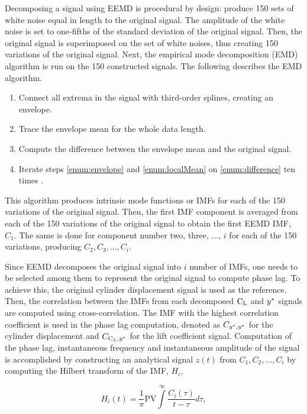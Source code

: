 \documentclass[oneside]{utmthesis}
\begin{document}
Decomposing a signal using EEMD is procedural by design: produce 150 sets of white noise equal in length to the original signal. The amplitude of the white noise is set to one-fifths of the standard deviation of the original signal. Then, the original signal is superimposed on the set of white noises, thus creating 150 variations of the original signal. Next, the empirical mode decomposition (EMD) algorithm is run on the 150 constructed signals. The following describes the EMD algorithm.

\begin{enumerate} \label{enumerate:emd}
  \item Connect all extrema in the signal with third-order splines, creating an envelope. \label{enum:envelope}
  \item Trace the envelope mean for the whole data length. \label{enum:localMean}
  \item Compute the difference between the envelope mean and the original signal. \label{enum:difference}
  \item Iterate steps \ref{enum:envelope} and \ref{enum:localMean} on \ref{enum:difference} ten times \citep{Wu2008}.
\end{enumerate}

This algorithm produces intrinsic mode functions or IMFs for each of the 150 variations of the original signal. Then, the first IMF component is averaged from each of the 150 variations of the original signal to obtain the first EEMD IMF, $C_{1}$. The same is done for component number two, three, ..., $i$ for each of the 150 variations, producing $C_{2},C_{3},\dots,C_{i}$.

Since EEMD decomposes the original signal into $i$ number of IMFs, one needs to be selected among them to represent the original signal to compute phase lag. To achieve this, the original cylinder displacement signal is used as the reference. Then, the correlation between the IMFs from each decomposed $\text{C}_{\text{L}}$ and $y^{*}$ signals are computed using cross-correlation. The IMF with the highest correlation coefficient is used in the phase lag computation, denoted as $C_{y^{*},y^{*}}$ for the cylinder displacement and $C_{\text{C}_{L},y^{*}}$ for the lift coefficient signal. Computation of the phase lag, instantaneous frequency and instantaneous amplitude of the signal is accomplished by constructing an analytical signal $z \left( t \right)$ from $C_{1},C_{2},\dots,C_{i}$ by computing the Hilbert transform of the IMF, $H_{i}$,

\begin{equation}
  H_{i} \left( t \right) = \frac{1}{\pi} \text{PV} \int\limits_{}^{\infty} \frac{C_{i} \left( \tau \right)}{t - \tau} d\tau,
  \label{eq:hilbertTransform}
\end{equation}
\end{document}
